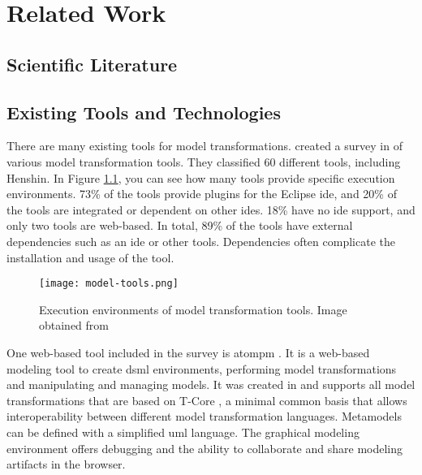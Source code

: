   \chapter{Related Work}
  \label{sec:related-work}

  \section{Scientific Literature}
  \label{subsec:related-scientific-literature}

  \section{Existing Tools and Technologies}
  \label{subsec:related-tools}

    There are many existing tools for model transformations. \citeauthor{kahani2019survey} created a survey in \citeyear{kahani2019survey} of various model transformation tools. They classified 60 different tools, including Henshin. In Figure \ref{fig:tools-environments}, you can see how many tools provide specific execution environments. 73\% of the tools provide plugins for the Eclipse \acs{ide}, and 20\% of the tools are integrated or dependent on other \acsp{ide}. 18\% have no \acs{ide} support, and only two tools are web-based. In total, 89\% of the tools have external dependencies such as an \acs{ide} or other tools. Dependencies often complicate the installation and usage of the tool. \cite{kahani2019survey}

  \begin{figure}[h]
    \centering
    \texttt{[image: model-tools.png]}
    \caption{Execution environments of model transformation tools. Image obtained from \cite{kahani2019survey}}
    \label{fig:tools-environments}
  \end{figure}

  One web-based tool included in the survey is \ac{atompm} \cite{atompm}. It is a web-based modeling tool to create \ac{dsml} environments, performing model transformations and manipulating and managing models. \cite{atompm} It was created in \citeyear{atompm} and supports all model transformations that are based on T-Core \cite{tcore}, a minimal common basis that allows interoperability between different model transformation languages. \cite{tcore} Metamodels can be defined with a simplified \acs{uml} language. The graphical modeling environment offers debugging and the ability to collaborate and share modeling artifacts in the browser. \cite{atompm}


